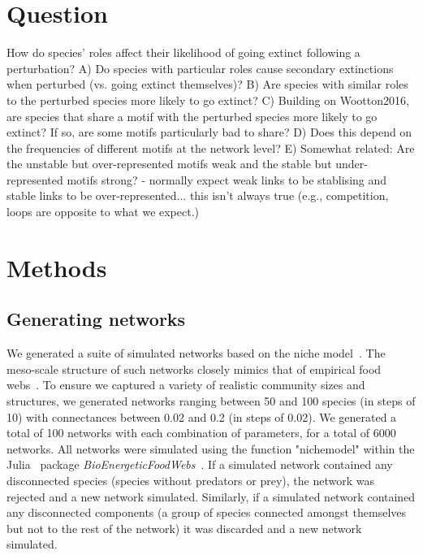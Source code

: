 \documentclass[12pt]{article}
\begin{document}
\section*{Question}

	How do species' roles affect their likelihood of going extinct following a perturbation? 
	A) Do species with particular roles cause secondary extinctions when perturbed (vs. going extinct themselves)?
	B) Are species with similar roles to the perturbed species more likely to go extinct?
	C) Building on Wootton2016, are species that share a motif with the perturbed species more likely to go extinct? If so, are some motifs particularly bad to share?
	D) Does this depend on the frequencies of different motifs at the network level? 
	E) Somewhat related: Are the unstable but over-represented motifs weak and the stable but under-represented motifs strong? - normally expect weak links to be stablising and stable links to be over-represented... this isn't always true (e.g., competition, loops are opposite to what we expect.)



\section*{Methods}

	\subsection*{Generating networks}

		We generated a suite of simulated networks based on the niche model~\citep{}. The meso-scale structure of such networks closely mimics that of empirical food webs~\citep{Stouffer2007}. To ensure we captured a variety of realistic community sizes and structures, we generated networks ranging between 50 and 100 species (in steps of 10) with connectances between 0.02 and 0.2 (in steps of 0.02). We generated a total of 100 networks with each combination of parameters, for a total of 6000 networks. All networks were simulated using the function "nichemodel" within the Julia~\citep{Julia} package \emph{BioEnergeticFoodWebs}~\citep{bioenergfw}. If a simulated network contained any disconnected species (species without predators or prey), the network was rejected and a new network simulated. Similarly, if a simulated network contained any disconnected components (a group of species connected amongst themselves but not to the rest of the network) it was discarded and a new network simulated.
\end{document}
